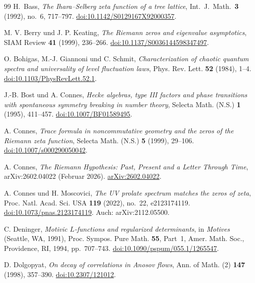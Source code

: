 \documentclass[12pt,a4paper]{article}
\theoremstyle{definition}
\theoremstyle{remark}
\begin{document}
\begingroup
\small
\begin{thebibliography}{99}
\setlength{\itemsep}{0.15em}
\setlength{\parsep}{0pt}
\setlength{\parskip}{0pt}
H.\ Bass,
\emph{The Ihara--Selberg zeta function of a tree lattice},
Int.\ J.\ Math.\ \textbf{3} (1992), no.~6, 717--797.
\href{https://doi.org/10.1142/S0129167X92000357}{doi:10.1142/S0129167X92000357}.

M. V. Berry und J. P. Keating,
\emph{The Riemann zeros and eigenvalue asymptotics},
SIAM Review \textbf{41} (1999), 236--266.
\href{https://doi.org/10.1137/S0036144598347497}{doi:10.1137/S0036144598347497}.

O. Bohigas, M.-J. Giannoni und C. Schmit,
\emph{Characterization of chaotic quantum spectra and universality of level fluctuation laws},
Phys. Rev. Lett. \textbf{52} (1984), 1--4.
\href{https://doi.org/10.1103/PhysRevLett.52.1}{doi:10.1103/PhysRevLett.52.1}.

J.-B. Bost und A. Connes,
\emph{Hecke algebras, type III factors and phase transitions with spontaneous symmetry breaking in number theory},
Selecta Math. (N.S.) \textbf{1} (1995), 411--457.
\href{https://doi.org/10.1007/BF01589495}{doi:10.1007/BF01589495}.

A. Connes,
\emph{Trace formula in noncommutative geometry and the zeros of the Riemann zeta function},
Selecta Math. (N.S.) \textbf{5} (1999), 29--106.
\href{https://doi.org/10.1007/s000290050042}{doi:10.1007/s000290050042}.

A. Connes,
\emph{The Riemann Hypothesis: Past, Present and a Letter Through Time},
arXiv:2602.04022 (Februar 2026).
\href{https://arxiv.org/abs/2602.04022}{arXiv:2602.04022}.

A. Connes und H. Moscovici,
\emph{The UV prolate spectrum matches the zeros of zeta},
Proc. Natl. Acad. Sci. USA \textbf{119} (2022), no.~22, e2123174119.
\href{https://doi.org/10.1073/pnas.2123174119}{doi:10.1073/pnas.2123174119}.
Auch: arXiv:2112.05500.

C. Deninger,
\emph{Motivic $L$-functions and regularized determinants},
in \emph{Motives} (Seattle, WA, 1991),
Proc. Sympos. Pure Math. \textbf{55}, Part~1, Amer. Math. Soc., Providence, RI, 1994, pp.~707--743.
\href{https://doi.org/10.1090/pspum/055.1/1265547}{doi:10.1090/pspum/055.1/1265547}.

D. Dolgopyat,
\emph{On decay of correlations in Anosov flows},
Ann. of Math. (2) \textbf{147} (1998), 357--390.
\href{https://doi.org/10.2307/121012}{doi:10.2307/121012}.


\end{thebibliography}
\end{document}
